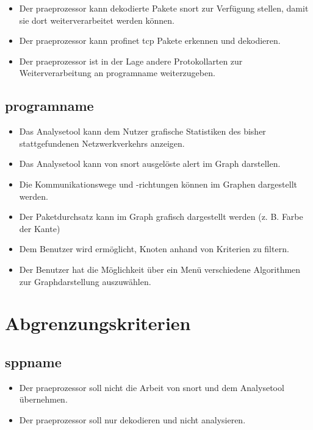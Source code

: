 \begin{itemize}

\item Der \gls{praeprozessor} kann dekodierte Pakete \gls{snort} zur Verfügung stellen, damit sie dort weiterverarbeitet werden können.

\item Der \gls{praeprozessor} kann \gls{profinet} \gls{tcp} Pakete erkennen und dekodieren.

\item Der \gls{praeprozessor} ist in der Lage andere Protokollarten zur Weiterverarbeitung an \gls{programname} weiterzugeben.
\end{itemize}

\subsection{\gls{programname}}

\begin{itemize}
\item Das Analysetool kann dem Nutzer grafische Statistiken des bisher stattgefundenen Netzwerkverkehrs anzeigen.

\item Das Analysetool kann von \gls{snort} ausgelöste \gls{alert} im Graph darstellen.

\item Die Kommunikationswege und -richtungen können im Graphen dargestellt werden.

\item Der Paketdurchsatz kann im Graph grafisch dargestellt werden (z. B. Farbe der Kante)

\item Dem Benutzer wird ermöglicht, Knoten anhand von Kriterien zu filtern.

\item Der Benutzer hat die Möglichkeit über ein Menü verschiedene Algorithmen zur Graphdarstellung auszuwählen.
\end{itemize}

\section{Abgrenzungskriterien}

\subsection{\gls{sppname}}
\begin{itemize}
\item Der \gls{praeprozessor} soll nicht die Arbeit von \gls{snort} und dem Analysetool übernehmen.

\item Der \gls{praeprozessor} soll nur dekodieren und nicht analysieren.

\end{itemize}

